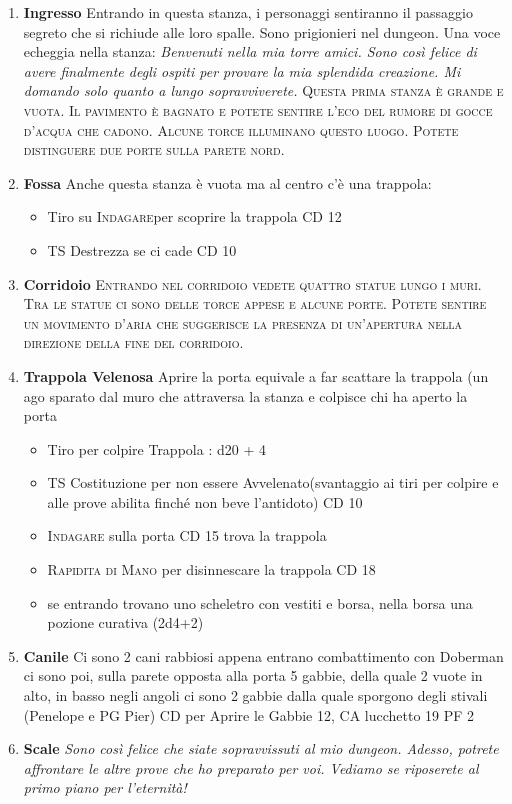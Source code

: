 \documentclass{article}
\begin{document}
\begin{enumerate}
    \item \textbf{Ingresso} Entrando in questa stanza, i personaggi sentiranno il passaggio segreto che si richiude alle loro spalle. Sono prigionieri nel dungeon. Una voce echeggia nella stanza: \textit{Benvenuti nella mia torre amici. Sono così felice di avere finalmente degli ospiti per provare la mia splendida creazione.
Mi domando solo quanto a lungo sopravviverete.} \textsc{Questa prima stanza è grande e vuota. Il pavimento è bagnato e potete sentire l'eco del rumore di gocce d'acqua che cadono. Alcune torce illuminano questo luogo. Potete distinguere due porte sulla parete nord.}
    \item \textbf{Fossa} Anche questa stanza è vuota ma al centro c'è una trappola:
        \begin{itemize}
            \item Tiro su \textsc{Indagare}per scoprire la trappola CD 12
            \item TS Destrezza se ci cade CD 10
        \end{itemize}
    \item \textbf{Corridoio} \textsc{Entrando nel corridoio vedete quattro statue lungo i muri. Tra le statue ci sono delle torce appese e alcune porte. Potete sentire un movimento d'aria che suggerisce la presenza di un'apertura nella direzione della fine del corridoio.}
    \item \textbf{Trappola Velenosa} Aprire la porta equivale a far scattare la trappola (un ago sparato dal muro che attraversa la stanza e colpisce chi ha aperto la porta
        \begin{itemize}
            \item Tiro per colpire Trappola : d20 + 4
            \item TS Costituzione per non essere Avvelenato(svantaggio ai tiri per colpire e alle prove abilita finché non beve l'antidoto) CD 10
            \item \textsc{Indagare} sulla porta CD 15 trova la trappola
            \item \textsc{Rapidita di Mano} per disinnescare la trappola CD 18
            \item se entrando trovano uno scheletro con vestiti e borsa, nella borsa una pozione curativa (2d4+2)
        \end{itemize}
    \item \textbf{Canile} Ci sono 2 cani rabbiosi appena entrano combattimento con Doberman \newline
         ci sono poi, sulla parete opposta alla porta 5 gabbie, della quale 2 vuote in alto, in basso negli angoli ci sono 2 gabbie dalla quale sporgono degli stivali (Penelope e PG Pier) 
        CD per Aprire le Gabbie 12, CA lucchetto 19 PF 2
       
    \item \textbf{Scale} \textit{Sono così felice che siate sopravvissuti al mio dungeon.
Adesso, potrete affrontare le altre prove che ho preparato per voi. Vediamo se riposerete al primo piano per l'eternità!}

\end{enumerate}
\newpage
\end{document}
